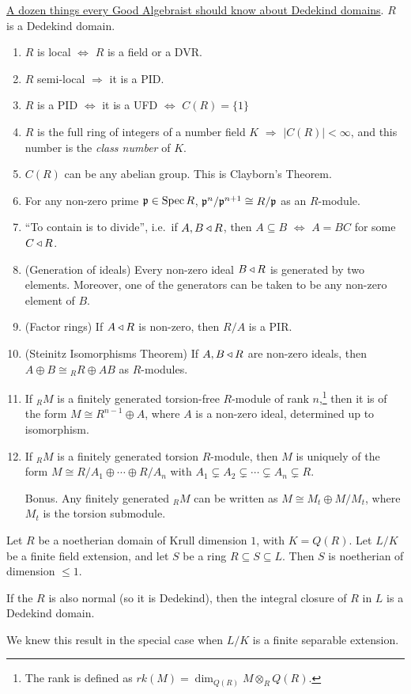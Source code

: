 \underline{A dozen things every Good Algebraist should know about Dedekind domains}. $R$
 is a Dedekind domain.
 \begin{enumerate}
   \item $R$ is local $\Longleftrightarrow$ $R$ is a field or a DVR.
   \item $R$ semi-local $\Longrightarrow$ it is a PID.
   \item $R$ is a PID $\Longleftrightarrow$ it is a UFD $\Longleftrightarrow$ $C(R)=\{1\}$
   \item $R$ is the full ring of integers of a number field $K$ $\Longrightarrow$ $|C(R)|<
   \infty$, and this number is the \emph{class number} of $K$.
   \item $C(R)$ can be any abelian group. This is Clayborn's Theorem.
   \item For any non-zero prime $\mathfrak{p}\in \operatorname{Spec} R$, $\mathfrak{p}^n/\mathfrak{p}^{n+1}\cong R/\mathfrak{p}$ as an
   $R$-module.
   \item ``To contain is to divide'', i.e.~if $A,B\triangleleft R$, then $A\subseteq B$
   $\Longleftrightarrow$ $A=BC$ for some $C\triangleleft R$.
   \item (Generation of ideals) Every non-zero ideal $B\triangleleft R$ is generated by two elements.
   Moreover, one of the generators can be taken to be any non-zero element of $B$.
   \item (Factor rings) If $A\triangleleft R$ is non-zero, then $R/A$ is a PIR.
   \item (Steinitz Isomorphisms Theorem) If $A,B\triangleleft R$ are non-zero ideals, then $A\oplus
   B\cong {}_RR\oplus AB$ as $R$-modules.
   \item If ${}_RM$ is a finitely generated torsion-free $R$-module of rank $n$,\footnote{The
   rank is defined as $rk(M)=\dim_{Q(R)} M\otimes_R Q(R)$.} then it is of the
   form $M\cong R^{n-1}\oplus A$, where $A$ is a non-zero ideal, determined up to
   isomorphism.
   \item If ${}_RM$ is a finitely generated torsion $R$-module, then $M$ is uniquely of the
   form $M\cong R/A_1\oplus
   \cdots \oplus R/A_n$ with $A_1\subsetneq A_2\subsetneq \cdots \subsetneq
   A_n\subsetneq R$.
   \item[Bonus.] Any finitely generated ${}_RM$ can be written as $M\cong M_t \oplus
   M/M_t$, where $M_t$ is the torsion submodule.
 \end{enumerate}

 \begin{theorem}
   Let $R$ be a noetherian domain of Krull dimension $1$, with $K=Q(R)$. Let $L/K$ be a
   finite field extension, and let $S$ be a ring $R\subseteq S\subseteq L$. Then $S$ is
   noetherian of dimension $\le 1$.
 \end{theorem}
 \begin{corollary}
   If the $R$ is also normal (so it is Dedekind), then the integral closure of $R$ in $L$
   is a Dedekind domain.
 \end{corollary}
 We knew this result in the special case when $L/K$ is a finite separable extension.

